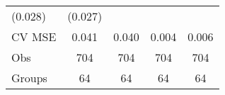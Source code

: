 \documentclass[12pt,twoside]{reedthesis}
\begin{document}
\begin{longtable}[]{@{}lcccc@{}}
\begin{minipage}[t]{0.14\columnwidth}
  (0.028)\strut
  \end{minipage} & \begin{minipage}[t]{0.14\columnwidth}\centering\strut
  (0.027)\strut
  \end{minipage}\tabularnewline
  \begin{minipage}[t]{0.26\columnwidth}\raggedright\strut
  CV MSE\strut
  \end{minipage} & \begin{minipage}[t]{0.12\columnwidth}\centering\strut
  0.041\strut
  \end{minipage} & \begin{minipage}[t]{0.13\columnwidth}\centering\strut
  0.040\strut
  \end{minipage} & \begin{minipage}[t]{0.14\columnwidth}\centering\strut
  0.004\strut
  \end{minipage} & \begin{minipage}[t]{0.14\columnwidth}\centering\strut
  0.006\strut
  \end{minipage}\tabularnewline
  \begin{minipage}[t]{0.26\columnwidth}\raggedright\strut
  Obs\strut
  \end{minipage} & \begin{minipage}[t]{0.12\columnwidth}\centering\strut
  704\strut
  \end{minipage} & \begin{minipage}[t]{0.13\columnwidth}\centering\strut
  704\strut
  \end{minipage} & \begin{minipage}[t]{0.14\columnwidth}\centering\strut
  704\strut
  \end{minipage} & \begin{minipage}[t]{0.14\columnwidth}\centering\strut
  704\strut
  \end{minipage}\tabularnewline
  \begin{minipage}[t]{0.26\columnwidth}\raggedright\strut
  Groups\strut
  \end{minipage} & \begin{minipage}[t]{0.12\columnwidth}\centering\strut
  64\strut
  \end{minipage} & \begin{minipage}[t]{0.13\columnwidth}\centering\strut
  64\strut
  \end{minipage} & \begin{minipage}[t]{0.14\columnwidth}\centering\strut
  64\strut
  \end{minipage} & \begin{minipage}[t]{0.14\columnwidth}\centering\strut
  64\strut
  \end{minipage}\tabularnewline
  \bottomrule
  \end{longtable}
  
\end{document}
